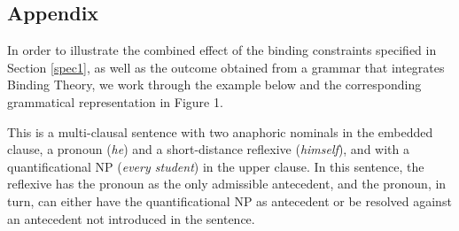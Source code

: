 \documentclass[output=paper
,modfonts
,nonflat]{langsci/langscibook}
\begin{document}
\begin{paperappendix}
\section*{Appendix \label{verif}}
\setcounter{section}{1}


In order to illustrate the combined effect of the binding constraints specified in Section \ref{spec1}, 
as well as the outcome obtained from a grammar that integrates Binding Theory,
we work through the example below and the corresponding grammatical
representation in Figure 1. %
%



\begin{exe}
\end{exe}

This is a
multi-clausal sentence with two anaphoric nominals in the embedded
clause, a pronoun ({\em he}) and a short-distance reflexive ({\em himself}), and with a quantificational
NP ({\em every student}) in the upper clause. In this sentence,
the reflexive has the pronoun as the only admissible antecedent,
and the pronoun, in turn, can either have the quantificational
NP as antecedent or be resolved against an antecedent not 
introduced in the sentence.


\end{paperappendix}
\end{document}
